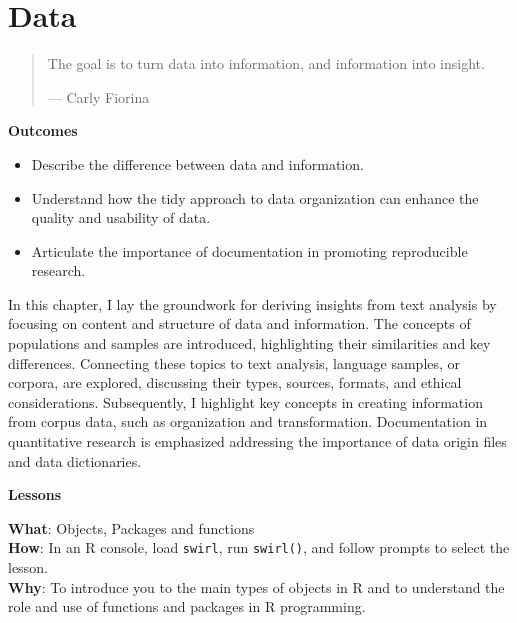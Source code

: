 \documentclass[
  letterpaper,
]{latex/krantz}
\providecommand{\tightlist}{%
  \setlength{\itemsep}{0pt}\setlength{\parskip}{0pt}}\usepackage{longtable,booktabs,array}
\theoremstyle{definition}
\theoremstyle{remark}
\begin{document}
\chapter{Data}\label{sec-data-chapter}

\begin{quote}
The goal is to turn data into information, and information into insight.

--- Carly Fiorina
\end{quote}

\begin{tcolorbox}[enhanced jigsaw, colframe=quarto-callout-color-frame, breakable, bottomrule=.15mm, arc=.35mm, left=2mm, opacityback=0, rightrule=.15mm, colback=white, toprule=.15mm, leftrule=.75mm]

\textbf{ Outcomes}

\begin{itemize}
\tightlist
\item
  Describe the difference between data and information.
\item
  Understand how the tidy approach to data organization can enhance the
  quality and usability of data.
\item
  Articulate the importance of documentation in promoting reproducible
  research.
\end{itemize}

\end{tcolorbox}

In this chapter, I lay the groundwork for deriving insights from text
analysis by focusing on content and structure of data and information.
The concepts of populations and samples are introduced, highlighting
their similarities and key differences. Connecting these topics to text
analysis, language samples, or corpora, are explored, discussing their
types, sources, formats, and ethical considerations. Subsequently, I
highlight key concepts in creating information from corpus data, such as
organization and transformation. Documentation in quantitative research
is emphasized addressing the importance of data origin files and data
dictionaries.

\begin{tcolorbox}[enhanced jigsaw, colframe=quarto-callout-color-frame, breakable, bottomrule=.15mm, arc=.35mm, left=2mm, opacityback=0, rightrule=.15mm, colback=white, toprule=.15mm, leftrule=.75mm]

\textbf{ Lessons}

\textbf{What}: Objects, Packages and functions\\
\textbf{How}: In an R console, load \texttt{swirl}, run
\texttt{swirl()}, and follow prompts to select the lesson.\\
\textbf{Why}: To introduce you to the main types of objects in R and to
understand the role and use of functions and packages in R programming.

\end{tcolorbox}
\end{document}
